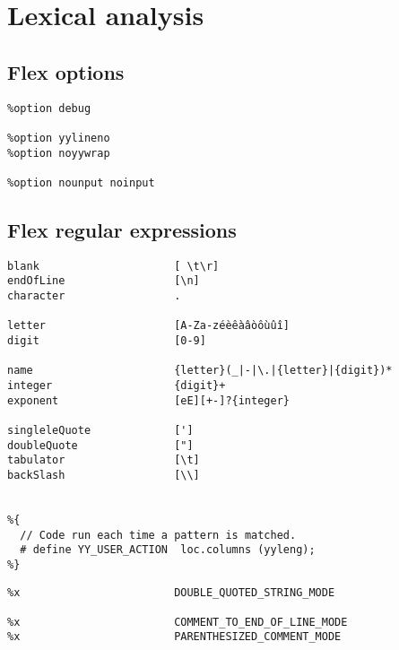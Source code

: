 \section{Lexical analysis}

\subsection{Flex options}

\begin{lstlisting}[language=Terminal]
%option interactive
%option debug

%option yylineno
%option noyywrap

%option nounput noinput
\end{lstlisting}


\subsection{Flex regular expressions}

\begin{lstlisting}[language=Terminal]
blank                     [ \t\r]
endOfLine                 [\n]
character                 .

letter                    [A-Za-zéèêàâòôùûî]
digit                     [0-9]

name                      {letter}(_|-|\.|{letter}|{digit})*
integer                   {digit}+
exponent                  [eE][+-]?{integer}

singleleQuote             [']
doubleQuote               ["]
tabulator                 [\t]
backSlash                 [\\]


%{
  // Code run each time a pattern is matched.
  # define YY_USER_ACTION  loc.columns (yyleng);
%}
\end{lstlisting}


\begin{lstlisting}[language=Terminal]
%x                        SINGLE_QUOTED_STRING_MODE
%x                        DOUBLE_QUOTED_STRING_MODE

%x                        COMMENT_TO_END_OF_LINE_MODE
%x                        PARENTHESIZED_COMMENT_MODE
\end{lstlisting}

